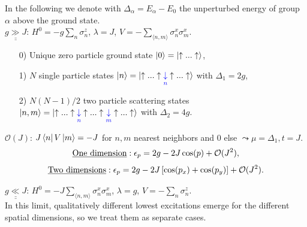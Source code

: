 \noindent In the following we denote with $\Delta_{\alpha} = E_{\alpha} - E_0$ the unperturbed energy of group $\alpha$ above the ground state. \\

\noindent $\underline{\underline{g \gg J}}$: $H^0 = - g \sum\limits_n \sigma^z_n$, $\lambda = J$, $V = - \sum\limits_{\langle n,m \rangle} \sigma^x_n \sigma^x_m$.
\begin{enumerate}
	\item[0)] Unique zero particle ground state $\ket{0} = \ket{\uparrow ... \uparrow}$,
	\item[1)] $N$ single particle states $\ket{n} =  \ket{\uparrow ... \uparrow \underset{\textcolor{blue}{n}}{\textcolor{blue}{\downarrow}} \uparrow ... \uparrow}$ with $\Delta_1 = 2g$,
	\item[2)] $N(N-1)/2$ two particle scattering states $\ket{n, m} = \ket{\uparrow ... \uparrow \underset{\textcolor{blue}{n}}{\textcolor{blue}{\downarrow}} \uparrow ... \uparrow \underset{\textcolor{blue}{m}}{\textcolor{blue}{\downarrow}} \uparrow ... \uparrow}$ with $\Delta_2 = 4g$.
\end{enumerate}
\noindent $\mathcal{O}(J)$: $J \bra{n} V \ket{m} = -J$ for $n, m$ nearest neighbors and $0$ else $\leadsto \mu = \Delta_1, t = J$. \\
\begin{equation} \label{eq:dispersion_large_g}
	\text{\underline{One dimension}}: \epsilon_p = 2g - 2J \cos(p) + \mathcal{O}(J^2),
\end{equation}
\begin{equation}
	\text{\underline{Two dimensions}}: \epsilon_p = 2g - 2J \left[\cos(p_x) + \cos(p_y)\right] + \mathcal{O}(J^2) . 
\end{equation}

\vspace*{1.5em}
\noindent $\underline{\underline{g \ll J}}$: $H^0 = -J \sum\limits_{\langle n,m \rangle} \sigma^x_n \sigma^x_m$, $\lambda = g$, $V = - \sum\limits_n \sigma^z_n$. \\

\noindent In this limit, qualitatively different lowest excitations emerge for the different spatial dimensions, so we treat them as separate cases. \\

